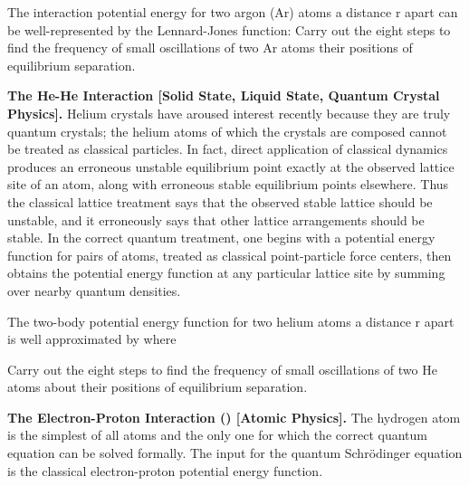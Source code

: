 {\begin{one-digit-list}
The interaction potential energy for two argon (Ar) atoms a distance r apart
can be well-represented by the Lennard-Jones function:
%
%
%
%
%
%
Carry out the eight steps to find the frequency of small oscillations of
two Ar atoms their positions of equilibrium separation.
%
\item [5.] \textbf{The He-He  Interaction
[Solid State, Liquid State, Quantum Crystal Physics].}
Helium crystals have aroused interest recently because they are truly
quantum crystals; the helium atoms of which the crystals are composed cannot
be treated as classical particles.
In fact, direct application of classical dynamics produces an erroneous
unstable equilibrium point exactly at the observed lattice site of an atom,
along with erroneous stable equilibrium points elsewhere.
Thus the classical lattice treatment says that the observed stable lattice
should be unstable, and it erroneously says that other lattice arrangements
should be stable.
In the correct quantum treatment, one begins with a potential energy
function for pairs of atoms, treated as classical point-particle force
centers, then obtains the potential energy function at any particular
lattice site by summing over nearby quantum densities.

The two-body potential energy function for two helium atoms a distance r
apart is well approximated by
%
%
%
where
%
%
%

Carry out the eight steps to find the frequency of small oscillations of
two He atoms about their positions of equilibrium separation.

\item [6.] {\bf The Electron-Proton Interaction ()
[Atomic Physics].}
The hydrogen atom is the simplest of all atoms and the only one for which
the correct quantum equation can be solved formally.
The input for the quantum Schr\"{o}dinger equation is the classical
electron-proton potential energy function.


\end{one-digit-list}}
